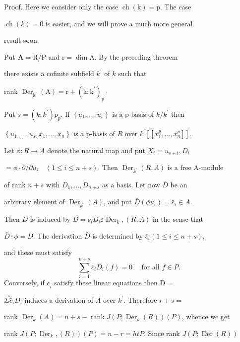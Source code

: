 Proof. Here we consider only the case $\operatorname{ch}(\mathrm{k})=\mathrm{p}$. The case

$\operatorname{ch}(k)=0$ is easier, and we will prove a much more general

result soon.

Put $\mathbf{A}=\mathrm{R} / \mathrm{P}$ and $\mathrm{r}=\operatorname{dim} \mathrm{A}$. $\mathrm{By}$ the preceding theorem

there exists a cofinite subfield $k^{\prime}$ of $k$ such that

rank $\operatorname{Der}_{\mathrm{k}^{\prime}}(\mathrm{A})=\mathrm{r}+\left(\mathrm{k}: \mathrm{k}^{\prime}\right)_{\mathrm{p}} \cdot$

Put $s=\left(k: k^{\prime}\right) p_{p}$. If $\left\{u_{1}, \ldots, u_{s}\right\}$ is a p-basis of $k / k^{\prime}$ then

$\left\{u_{1}, \ldots, u_{s}, x_{1}, \ldots, x_{n}\right\}$ is a p-basis of $R$ over $k^{\prime}\left[\left[x_{1}^{p}, \ldots, x_{n}^{p}\right]\right]$.

Let $\phi: R \rightarrow A$ denote the natural map and put $X_{i}=u_{s+i}, D_{i}$

$=\phi \cdot \partial / \partial u_{i} \quad(1 \leqslant i \leqslant n+s)$. Then $\operatorname{Der}_{k^{\prime}}(R, A)$ is a free A-module

of rank $n+s$ with $D_{1}, \ldots, D_{n+s}$ as a basis. Let now $\bar{D}$ be an

arbitrary element of $\operatorname{Der}_{k^{\prime}}(A)$, and put $\bar{D}\left(\phi u_{i}\right)=\bar{c}_{i} \in A$.

Then $\bar{D}$ is induced by $D=\bar{c}_{i} D_{i} \varepsilon \operatorname{Der}_{k},(R, A)$ in the sense that

$\bar{D} \cdot \phi=D$. The derivation $\bar{D}$ is determined by $\bar{c}_{i}(1 \leqslant i \leqslant n+s)$,

and these must satisfy
$$
\sum_{i=1}^{n+s} \bar{c}_{i} D_{i}(f)=0 \quad \text { for all } f \in P .
$$
Conversely, if $\bar{c}_{\dot{i}}$ satisfy these linear equations then $\mathrm{D}=$

$\overline{\Sigma \bar{c}_{i}} D_{i}$ induces a derivation of $A$ over $k^{\prime}$. Therefore $r+s=$

rank $\operatorname{Der}_{k}(A)=n+s-\operatorname{rank} J\left(P ; \operatorname{Der}_{k}(R)\right)(P)$, whence we get

rank $J\left(P ; \operatorname{Der}_{k},(R)\right)(P)=n-r=h t P$. Since rank $J(P ; \operatorname{Der}(R))$

